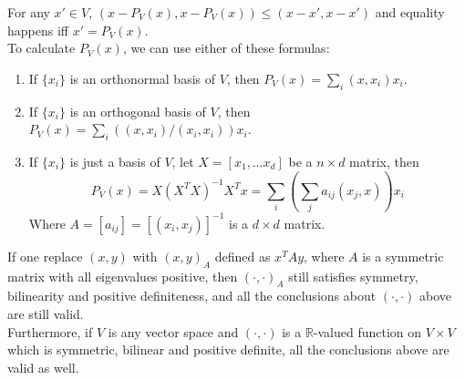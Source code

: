 \documentclass[20pt]{article} %
\theoremstyle{break}
\begin{document}
For any $x'\in V$, $(x-P_V(x), x-P_V(x))\leq (x-x', x-x')$ and equality happens iff $x'=P_V(x)$.\\

To calculate $P_V(x)$, we can use either of these formulas:

\begin{enumerate}
\item If $\{x_i\}$ is an orthonormal basis of $V$, then $P_V(x)=\sum_i(x, x_i)x_i$.
\item If $\{x_i\}$ is an orthogonal basis of $V$, then $P_V(x)=\sum_i((x, x_i)/(x_i, x_i))x_i$.
\item If $\{x_i\}$ is just a basis of $V$, let $X=[x_1, \dots x_d]$ be a $n\times d$ matrix, then
  \[P_V(x)=X(X^TX)^{-1}X^Tx=\sum_i(\sum_j a_{ij}(x_j, x)) x_i\]
  Where $A=[a_{ij}]=[(x_i, x_j)]^{-1}$ is a $d\times d$ matrix. 
\end{enumerate}

If one replace $(x, y)$ with $(x, y)_A$ defined as $x^TAy$, where $A$ is a symmetric matrix with all eigenvalues positive, then $(\cdot, \cdot)_A$ still satisfies symmetry, bilinearity and positive definiteness, and all the conclusions about $(\cdot, \cdot)$ above are still valid.\\

Furthermore, if $V$ is any vector space and $(\cdot, \cdot)$ is a $\mathbb{R}$-valued function on $V\times V$ which is symmetric, bilinear and positive definite, all the conclusions above are valid as well.
\end{document}

